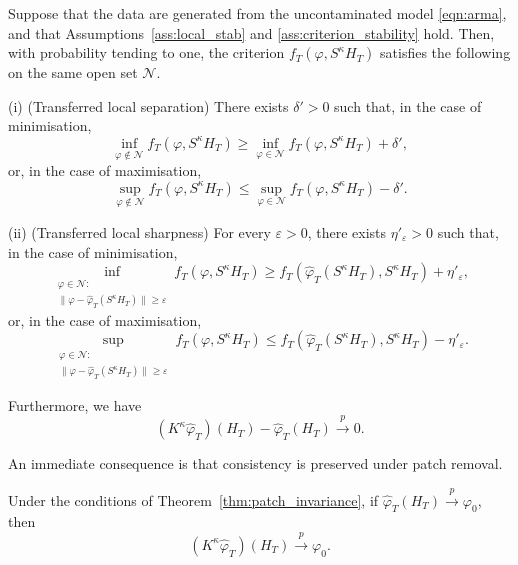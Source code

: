 \documentclass[12pt]{article}
\numberwithin{equation}{section}
\begin{document}
\begin{theorem}
\label{thm:patch_invariance}
Suppose that the data are generated from the uncontaminated model \eqref{eqn:arma}, 
and that Assumptions~\ref{ass:local_stab} and \ref{ass:criterion_stability} hold.
Then, with probability tending to one, the criterion $f_T(\varphi,S^\kappa H_T)$ satisfies the following on the same open set $\mathcal N$.

\noindent
(i) (Transferred local separation)
There exists $\delta'>0$ such that, in the case of minimisation,
\begin{equation}
\inf_{\varphi\notin\mathcal N} f_T(\varphi,S^\kappa H_T)
\ge
\inf_{\varphi\in\mathcal N} f_T(\varphi,S^\kappa H_T)+\delta',
\end{equation}
or, in the case of maximisation,
\begin{equation}
\sup_{\varphi\notin\mathcal N} f_T(\varphi,S^\kappa H_T)
\le
\sup_{\varphi\in\mathcal N} f_T(\varphi,S^\kappa H_T)-\delta'.
\end{equation}

\noindent
(ii) (Transferred local sharpness)
For every $\varepsilon>0$, there exists $\eta'_\varepsilon>0$ such that, in the case of minimisation,
\begin{equation}
\inf_{\substack{\varphi\in\mathcal N:\\
\|\varphi-\hat{\varphi}_T(S^\kappa H_T)\|\ge\varepsilon}}
f_T(\varphi,S^\kappa H_T)
\ge
f_T(\hat{\varphi}_T(S^\kappa H_T),S^\kappa H_T)+\eta'_\varepsilon,
\end{equation}
or, in the case of maximisation,
\begin{equation}
\sup_{\substack{\varphi\in\mathcal N:\\
\|\varphi-\hat{\varphi}_T(S^\kappa H_T)\|\ge\varepsilon}}
f_T(\varphi,S^\kappa H_T)
\le
f_T(\hat{\varphi}_T(S^\kappa H_T),S^\kappa H_T)-\eta'_\varepsilon.
\end{equation}

Furthermore, we have
\begin{equation}
(K^\kappa \hat{\varphi}_T)(H_T) - \hat{\varphi}_T(H_T)
\overset{p}{\longrightarrow}0.
\end{equation}
\end{theorem}

An immediate consequence is that consistency is preserved under patch removal.

\begin{corollary}\label{cor:patch_consistency}
Under the conditions of Theorem~\ref{thm:patch_invariance},
if
$\hat{\varphi}_T(H_T)\overset{p}{\longrightarrow}\varphi_0$,
then
\begin{equation}
(K^\kappa \hat{\varphi}_T)(H_T)\overset{p}{\longrightarrow}\varphi_0.
\end{equation}
\end{corollary}
\end{document}
